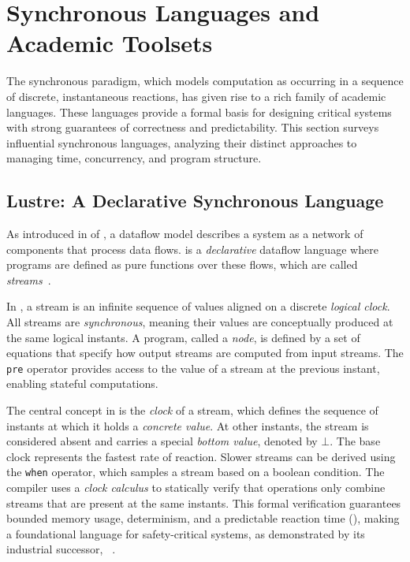 \section{Synchronous Languages and Academic Toolsets}
\label{sec:sota:synchronous}

The synchronous paradigm, which models computation as occurring in a sequence of discrete,
instantaneous reactions, has given rise to a rich family of academic languages. These languages
provide a formal basis for designing critical systems with strong guarantees of correctness and
predictability. This section surveys influential synchronous languages, analyzing their distinct
approaches to managing time, concurrency, and program structure.

\subsection{Lustre: A Declarative Synchronous Language}
\label{sec:sota:synchronous:lustre}

As introduced in  of , a dataflow model describes a system as a network of
components that process data flows. \Lustre is a \emph{declarative} dataflow language where programs
are defined as pure functions over these flows, which are called \emph{streams}~\cite{DBLP:conf/popl/CaspiPHP87}.

In \Lustre, a stream is an infinite sequence of values aligned on a discrete \emph{logical clock}.
All streams are \emph{synchronous}, meaning their values are conceptually produced at the same
logical instants. A program, called a \emph{node}, is defined by a set of equations that specify how
output streams are computed from input streams. The \texttt{pre} operator provides access to the
value of a stream at the previous instant, enabling stateful computations.

The central concept in \Lustre is the \emph{clock} of a stream, which defines the sequence of
instants at which it holds a \emph{concrete value}. At other instants, the stream is considered
absent and carries a special \emph{bottom value}, denoted by $\bot$. The base clock represents the
fastest rate of reaction. Slower streams can be derived using the \texttt{when} operator, which
samples a stream based on a boolean condition. The compiler uses a \emph{clock calculus} to
statically verify that operations only combine streams that are present at the same instants. This
formal verification guarantees bounded memory usage, determinism, and a predictable reaction time
(\wcet), making \Lustre a foundational language for safety-critical systems, as demonstrated by its
industrial successor, \Scade~\cite{DBLP:conf/fdl/ColacoPPP18}.

